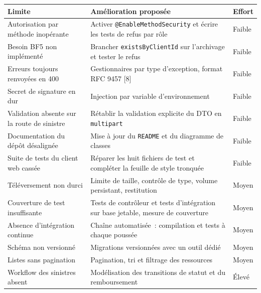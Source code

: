 \documentclass[12pt,a4paper]{report}
\begin{document}
{\small
\begin{tabularx}{\linewidth}{|X|X|X|}
\hline
\textbf{Limite} & \textbf{Amélioration proposée} & \textbf{Effort} \\ \hline
Autorisation par méthode inopérante & Activer \texttt{@EnableMethodSecurity} et écrire les tests de refus par rôle & Faible \\ \hline
Besoin BF5 non implémenté & Brancher \texttt{existsByClientId} sur l'archivage et tester le refus & Faible \\ \hline
Erreurs toujours renvoyées en 400 & Gestionnaires par type d'exception, format RFC 9457 [8] & Faible \\ \hline
Secret de signature en dur & Injection par variable d'environnement & Faible \\ \hline
Validation absente sur la route de sinistre & Rétablir la validation explicite du DTO en \texttt{multipart} & Faible \\ \hline
Documentation du dépôt désalignée & Mise à jour du \texttt{README} et du diagramme de classes & Faible \\ \hline
Suite de tests du client web cassée & Réparer les huit fichiers de test et compléter la feuille de style tronquée & Faible \\ \hline
Téléversement non durci & Limite de taille, contrôle de type, volume persistant, restitution & Moyen \\ \hline
Couverture de test insuffisante & Tests de contrôleur et tests d'intégration sur base jetable, mesure de couverture & Moyen \\ \hline
Absence d'intégration continue & Chaîne automatisée~: compilation et tests à chaque poussée & Moyen \\ \hline
Schéma non versionné & Migrations versionnées avec un outil dédié & Moyen \\ \hline
Listes sans pagination & Pagination, tri et filtrage des ressources & Moyen \\ \hline
Workflow des sinistres absent & Modélisation des transitions de statut et du remboursement & Élevé \\ \hline
\end{tabularx}

}
\newpage
\end{document}
